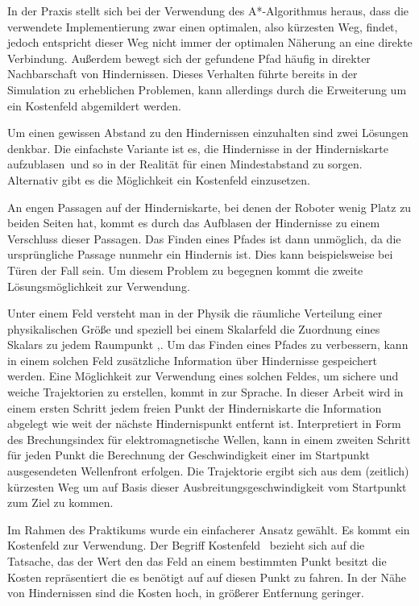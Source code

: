 In der Praxis stellt sich bei der Verwendung des A*-Algorithmus heraus, dass die verwendete Implementierung zwar einen optimalen, also kürzesten Weg, findet, jedoch entspricht dieser Weg nicht immer der optimalen Näherung an eine direkte Verbindung.
Außerdem bewegt sich der gefundene Pfad häufig in direkter Nachbarschaft von Hindernissen.
Dieses Verhalten führte bereits in der Simulation zu erheblichen Problemen, kann allerdings durch die Erweiterung um ein Kostenfeld abgemildert werden.

Um einen gewissen Abstand zu den Hindernissen einzuhalten sind zwei Lösungen denkbar.
Die einfachste Variante ist es, die Hindernisse in der Hinderniskarte \glqq aufzublasen\grqq\ und so in der Realität für einen Mindestabstand zu sorgen.
Alternativ gibt es die Möglichkeit ein Kostenfeld einzusetzen. 

An engen Passagen auf der Hinderniskarte, bei denen der Roboter wenig Platz zu beiden Seiten hat, kommt es durch das Aufblasen der Hindernisse zu einem Verschluss dieser Passagen.
Das Finden eines Pfades ist dann unmöglich, da die ursprüngliche Passage nunmehr ein Hindernis ist.
Dies kann beispielsweise bei Türen der Fall sein.
Um diesem Problem zu begegnen kommt die zweite Lösungsmöglichkeit zur Verwendung.

Unter einem Feld versteht man in der Physik die räumliche Verteilung einer physikalischen Größe und speziell bei einem Skalarfeld die Zuordnung eines Skalars zu jedem Raumpunkt \cite{allgFeld},\cite{skalarFeld}.
Um das Finden eines Pfades zu verbessern, kann in einem solchen Feld zusätzliche Information über Hindernisse gespeichert werden.
Eine Möglichkeit zur Verwendung eines solchen Feldes, um sichere und weiche Trajektorien zu erstellen, kommt in \cite{Garrido2007} zur Sprache. In dieser Arbeit wird in einem ersten Schritt jedem freien Punkt der Hinderniskarte die Information abgelegt wie weit der nächste Hindernispunkt entfernt ist. Interpretiert in Form des Brechungsindex für elektromagnetische Wellen, kann in einem zweiten Schritt für jeden Punkt die Berechnung der Geschwindigkeit einer im Startpunkt ausgesendeten Wellenfront erfolgen. Die Trajektorie ergibt sich aus dem (zeitlich) kürzesten Weg um auf Basis dieser Ausbreitungsgeschwindigkeit vom Startpunkt zum Ziel zu kommen.

Im Rahmen des Praktikums wurde ein einfacherer Ansatz gewählt. Es kommt ein Kostenfeld zur Verwendung.
Der Begriff \glqq Kostenfeld \grqq\ bezieht sich auf die Tatsache, das der Wert den das Feld an einem bestimmten Punkt besitzt die Kosten repräsentiert die es benötigt auf auf diesen Punkt zu fahren.
In der Nähe von Hindernissen sind die Kosten hoch, in größerer Entfernung geringer.


